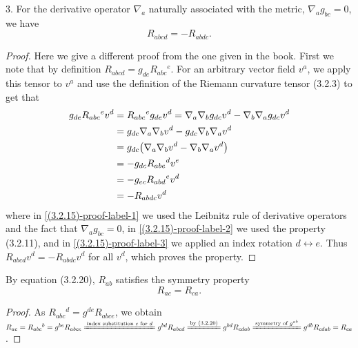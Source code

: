 \documentclass{note}
\numberwithin{equation}{chapter}
\begin{document}
\begin{quotebar}
    3. For the derivative operator $\nabla_a$ naturally associated with the
    metric, $\nabla_ag_{bc}=0$, we have
    \begin{equation*}
        R_{abcd} = - R_{abdc}.
    \end{equation*}
\end{quotebar}
\begin{proof}
    Here we give a different proof from the one given in the book. First we note
    that by definition $R_{abcd} = g_{de}R_{abc}{}^e$. For an arbitrary vector
    field $v^a$, we apply this tensor to $v^a$ and use the definition of the
    Riemann curvature tensor (3.2.3) to get that
    \begin{align}
        g_{de}R_{abc}{}^ev^d
         & = R_{abc}{}^eg_{de}v^d = \nabla_a\nabla_bg_{dc}v^d
        - \nabla_b\nabla_ag_{dc}v^d \nonumber                                \\
         & = g_{dc}\nabla_a\nabla_bv^d - g_{dc}\nabla_b\nabla_av^d
        \label{(3.2.15)-proof-label-1}                                       \\
         & = g_{dc}\prn{\nabla_a\nabla_bv^d - \nabla_b\nabla_av^d} \nonumber \\
         & = -g_{dc}R_{abe}{}^dv^e \label{(3.2.15)-proof-label-2}            \\
         & = -g_{ec}R_{abd}{}^ev^d \label{(3.2.15)-proof-label-3}            \\
         & = -R_{abdc}v^d \nonumber
    \end{align}
    where in \eqref{(3.2.15)-proof-label-1} we used the Leibnitz rule of derivative
    operators and the fact that $\nabla_ag_{bc}=0$, in
    \eqref{(3.2.15)-proof-label-2} we used the property (3.2.11), and in
    \eqref{(3.2.15)-proof-label-3} we applied an index rotation $d \leftrightarrow
        e$. Thus $R_{abcd}v^d = - R_{abdc}v^d$ for all $v^d$, which proves the
    property.
\end{proof}


\begin{quotebar}
    By equation (3.2.20), $R_{ab}$ satisfies the symmetry property
    \begin{equation*}
        R_{ac} = R_{ca}.
    \end{equation*}
\end{quotebar}
\begin{proof}
    As $R_{abc}{}^d = g^{de}R_{abce}$, we obtain $R_{ac} = R_{abc}{}^b =
        g^{be}R_{abce} \xlongequal{\text{index substitution }e\text{ for }d}
        g^{bd}R_{abcd} \xlongequal{\text{by (3.2.20)}} g^{bd}R_{cdab}
        \xlongequal{\text{symmetry of }g^{ab}} g^{db}R_{cdab} = R_{ca}$.
\end{proof}
\end{document}
